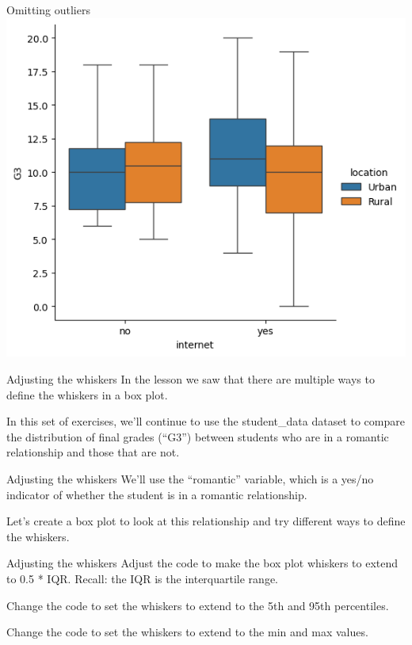 \documentclass[
  ignorenonframetext,
]{beamer}
\begin{document}
\begin{frame}{Omitting outliers}
\label{omitting-outliers-4}
\includegraphics{../images/im286.png}
\end{frame}

\begin{frame}{Adjusting the whiskers}
\label{adjusting-the-whiskers}
In the lesson we saw that there are multiple ways to define the whiskers
in a box plot.

In this set of exercises, we'll continue to use the student\_data
dataset to compare the distribution of final grades (``G3'') between
students who are in a romantic relationship and those that are not.
\end{frame}

\begin{frame}{Adjusting the whiskers}
\label{adjusting-the-whiskers-1}
We'll use the ``romantic'' variable, which is a yes/no indicator of
whether the student is in a romantic relationship.

Let's create a box plot to look at this relationship and try different
ways to define the whiskers.
\end{frame}

\begin{frame}{Adjusting the whiskers}
\label{adjusting-the-whiskers-2}
Adjust the code to make the box plot whiskers to extend to 0.5 * IQR.
Recall: the IQR is the interquartile range.

Change the code to set the whiskers to extend to the 5th and 95th
percentiles.

Change the code to set the whiskers to extend to the min and max values.
\end{frame}
\end{document}
